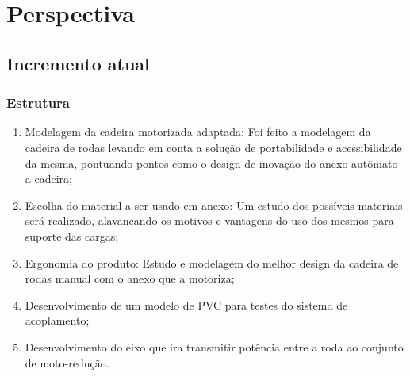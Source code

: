 \chapter[Perspectiva]{Perspectiva}

\section{Incremento atual}
  \subsection{Estrutura}
    \begin{enumerate}
      \item Modelagem da cadeira motorizada adaptada: Foi feito a modelagem da cadeira de rodas levando em conta a solução de portabilidade e acessibilidade da mesma, pontuando pontos como o design de inovação do anexo autômato a cadeira;

      \item Escolha do material a ser usado em anexo: Um estudo dos possíveis materiais será realizado, alavancando os motivos e vantagens do uso dos mesmos para suporte das cargas;

      \item Ergonomia do produto: Estudo e modelagem do melhor design da cadeira de rodas manual com o anexo que a motoriza;

 \item Desenvolvimento de um modelo de PVC para testes do sistema de acoplamento;

 \item Desenvolvimento do eixo que ira transmitir potência entre a roda ao conjunto de moto-redução.

    \end{enumerate}
